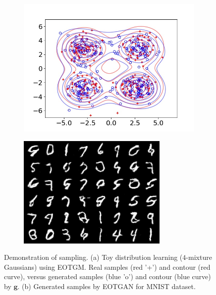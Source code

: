 \begin{figure}[!t]
  \captionsetup[subfigure]{justification=centering}
  \centering
  \begin{subfigure}[b]{0.44\textwidth}
    \centering
    \includegraphics[width=1\linewidth]{images/toy/gauss4/frame8.jpg}
    \caption{}
    \label{fig-toy}
  \end{subfigure}
  \centering
  \begin{subfigure}[b]{0.44\textwidth}
    \centering
    \includegraphics[width=0.85\linewidth]{images/mnist/fake/eot_18500_crop.png}\vspace{5pt}
    \caption{}
    \label{fig-fake-wgan}
  \end{subfigure}
  \caption{Demonstration of sampling. (a) Toy distribution learning ($4$-mixture Gaussians) using EOTGM. Real samples (red '+') and contour
    (red curve), versus generated samples (blue 'o') and contour (blue curve) by $\bm{g}$. (b) Generated samples by EOTGAN for MNIST dataset.}
    \vspace{0.4cm}
\end{figure}


